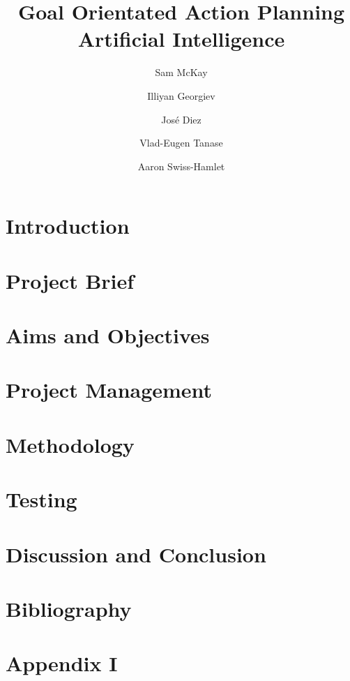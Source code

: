 \documentclass{report}
\begin{document}
\title{Goal Orientated Action Planning Artificial Intelligence}
\author{Sam McKay \and Illiyan Georgiev \and ‎José Diez\and Vlad-Eugen Tanase \and Aaron Swiss-Hamlet }
\maketitle
\tableofcontents
\chapter{Introduction}
\chapter{Project Brief}
\chapter{Aims and Objectives}
\chapter{Project Management}
\chapter{Methodology}
\chapter{Testing}
\chapter{Discussion and Conclusion}
\chapter{Bibliography}
\appendix
\chapter{Appendix I}
\end{document}

